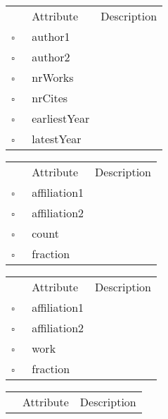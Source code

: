 \begin{table}
\caption{Coauthor  }

\begin{longtable}{llp{8cm}}
& Attribute & Description \\
$\square$\ & author1 &  \\
$\square$\ & author2 &  \\
$\square$\ & nrWorks &  \\
$\square$\ & nrCites &  \\
$\square$\ & earliestYear &  \\
$\square$\ & latestYear &  \\
\end{longtable}
\label{attr:Coauthor}
\end{table}

\begin{table}
\caption{CollabCount  }

\begin{longtable}{llp{8cm}}
& Attribute & Description \\
$\square$\ & affiliation1 &  \\
$\square$\ & affiliation2 &  \\
$\square$\ & count &  \\
$\square$\ & fraction &  \\
\end{longtable}
\label{attr:CollabCount}
\end{table}

\begin{table}
\caption{CollabWork  }

\begin{longtable}{llp{8cm}}
& Attribute & Description \\
$\square$\ & affiliation1 &  \\
$\square$\ & affiliation2 &  \\
$\square$\ & work &  \\
$\square$\ & fraction &  \\
\end{longtable}
\label{attr:CollabWork}
\end{table}

\clearpage
\begin{table}
\caption{Collection  }

\begin{longtable}{llp{8cm}}
& Attribute & Description \\
\end{longtable}
\label{attr:Collection}
\end{table}

